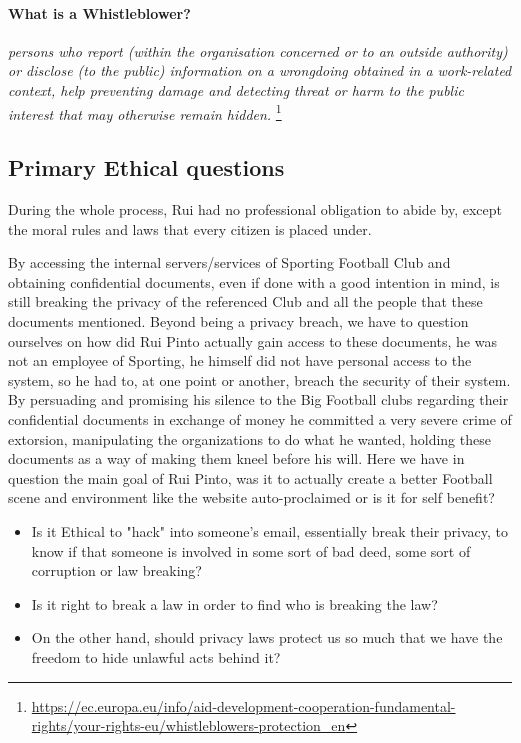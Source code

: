 \paragraph{What is a Whistleblower?}
\textit{persons who report (within the organisation concerned or to an outside authority) or disclose (to the public) information on a wrongdoing obtained in a work-related context, help preventing damage and detecting threat or harm to the public interest that may otherwise remain hidden.}
\footnote{\url{https://ec.europa.eu/info/aid-development-cooperation-fundamental-rights/your-rights-eu/whistleblowers-protection_en}}



\subsection{Primary Ethical questions}
During the whole process, Rui had no professional obligation to abide by, except the moral rules and laws that every citizen is placed under.

By accessing the internal servers/services of Sporting Football Club and obtaining confidential documents, even if done with a good intention in mind, is still breaking the privacy of the referenced Club and all the people that these documents mentioned.
Beyond being a privacy breach, we have to question ourselves on how did Rui Pinto actually gain access to these documents, he was not an employee of Sporting, he himself did not have personal access to the system, so he had to, at one point or another, breach the security  of their system.
By persuading and promising his silence to the Big Football clubs regarding their confidential documents in exchange of money he committed a very severe crime of extorsion, manipulating the organizations to do what he wanted, holding these documents as a way of making them kneel before his will.
Here we have in question the main goal of Rui Pinto, was it to actually create a better Football scene and environment like the website auto-proclaimed or is it for self benefit?


\begin{itemize}
    \item Is it Ethical to "hack" into someone's email, essentially break their privacy, to know if that someone is involved in some sort of bad deed, some sort of corruption or law breaking?
    \item Is it right to break a law in order to find who is breaking the law?
    \item On the other hand, should privacy laws protect us so much that we have the freedom to hide unlawful acts behind it?
\end{itemize}

